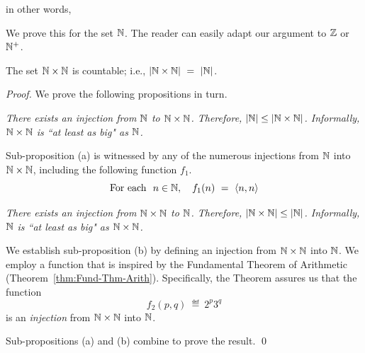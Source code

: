 \noindent
in other words, \\
\hspace*{.35in}{\em Pairing does not increase a set's order of infinity.}

\noindent
We prove this for the set $\mathbb{N}$.  The reader can easily adapt our argument to $\mathbb{Z}$ or $\mathbb{N}^+$.

\begin{prop}
\label{thm:|NxN|=|N|}
The set $\mathbb{N} \times \mathbb{N}$ is countable; i.e., $|\mathbb{N} \times \mathbb{N}| \ = \ |\mathbb{N}|$.
\end{prop}

\begin{proof}
We prove the following propositions in turn.

\medskip

{\em There exists an injection from $\mathbb{N}$ to $\mathbb{N} \times \mathbb{N}$.  Therefore, $|\mathbb{N}| \leq |\mathbb{N} \times \mathbb{N}|$. Informally, $\mathbb{N} \times \mathbb{N}$ is ``at least as big" as $\mathbb{N}$.}

\smallskip

\noindent
Sub-proposition (a) is witnessed by any of the numerous injections from $\mathbb{N}$ into $\mathbb{N} \times \mathbb{N}$, including the following function $f_1$.
\[ \mbox{For each } \ n \in \N, \ \ \ f_1(n) \ = \ \langle n,n \rangle \]

\medskip

{\em There exists an injection from $\mathbb{N} \times \mathbb{N}$ to $\mathbb{N}$.  Therefore, $|\mathbb{N} \times \mathbb{N}| \leq |\mathbb{N}|$. Informally, $\mathbb{N}$ is ``at least as big" as $\mathbb{N} \times \mathbb{N}$.}

\smallskip

\noindent
We establish sub-proposition (b) by defining an injection from $\mathbb{N} \times \mathbb{N}$ into $\mathbb{N}$.  We employ a function that is inspired by the Fundamental Theorem of Arithmetic (Theorem~\ref{thm:Fund-Thm-Arith}).  Specifically, the Theorem assures us that the function
\[ f_2(p,q) \ \eqdef \ 2^p 3^q \]
is an {\em injection} from $\mathbb{N} \times \mathbb{N}$ into $\mathbb{N}$.

\medskip

Sub-propositions (a) and (b) combine to prove the result.  \qed
\end{proof}

\bigskip

 

